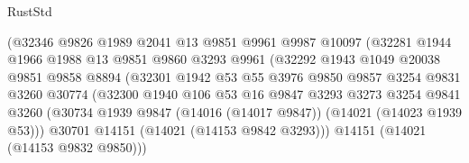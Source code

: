 \begin{lexlean}{RustStd}
\begin{coremodule}
                                (@32346
                                  @9826
                                  @1989
                                  @2041
                                  @13
                                  @9851
                                  @9961
                                  @9987
                                  @10097
                                  (@32281
                                    @1944
                                    @1966
                                    @1988
                                    @13
                                    @9851
                                    @9860
                                    @3293
                                    @9961
                                    (@32292
                                      @1943
                                      @1049
                                      @20038
                                      @9851
                                      @9858
                                      @8894
                                      (@32301
                                        @1942
                                        @53
                                        @55
                                        @3976
                                        @9850
                                        @9857
                                        @3254
                                        @9831
                                        @3260
                                        @30774
                                        (@32300
                                          @1940
                                          @106
                                          @53
                                          @16
                                          @9847
                                          @3293
                                          @3273
                                          @3254
                                          @9841
                                          @3260
                                          (@30734
                                            @1939
                                            @9847
                                            (@14016 (@14017 @9847))
                                            (@14021 (@14023 @1939 @53)))
                                          @30701
                                          @14151
                                          (@14021 (@14153 @9842 @3293)))
                                        @14151
                                        (@14021 (@14153 @9832 @9850)))

\end{coremodule}
\end{lexlean}
